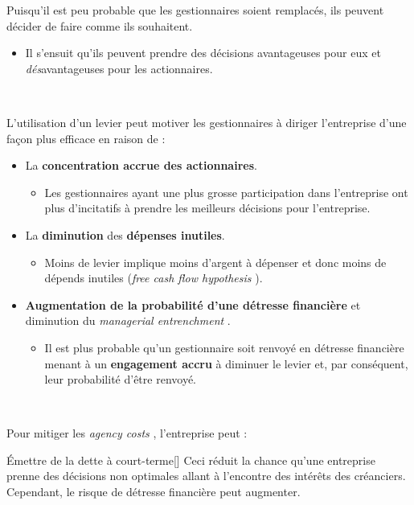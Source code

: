 \documentclass[10pt, french]{article}
\begin{document}
\begin{multicols*}{2}
\begin{definitionNOHFILLprop}
Puisqu'il est peu probable que les gestionnaires soient remplacés, ils peuvent décider de faire comme ils souhaitent.	\\

\begin{itemize}
	\item	Il s'ensuit qu'ils peuvent prendre des décisions avantageuses pour eux et \textit{dés}avantageuses pour les actionnaires.
\end{itemize}
\end{definitionNOHFILLprop}

\

L'utilisation d'un levier peut motiver les gestionnaires à diriger l'entreprise d'une façon plus efficace en raison de : 
\begin{itemize}
	\item	La \textbf{concentration accrue des actionnaires}.
		\begin{itemize}
		\item	Les gestionnaires ayant une plus grosse participation dans l'entreprise ont plus d'incitatifs à prendre les meilleurs décisions pour l'entreprise.
		\end{itemize}
	\item	La \textbf{diminution} des \textbf{dépenses inutiles}.
		\begin{itemize}
		\item	Moins de levier implique moins d'argent à dépenser et donc moins de dépends inutiles (\og \textit{free cash flow hypothesis} \fg{}).
		\end{itemize}
	\item	\textbf{Augmentation de la probabilité d'une détresse financière} et diminution du \og \textit{managerial entrenchment} \fg{}.
		\begin{itemize}
		\item	Il est plus probable qu'un gestionnaire soit renvoyé en détresse financière menant à un \textbf{engagement accru} à diminuer le levier et, par conséquent, leur probabilité d'être renvoyé.
		\end{itemize}
\end{itemize}

\

Pour mitiger les \og \textit{agency costs} \fg{}, l'entreprise peut : 
\begin{definitionGENERAL}{Émettre de la dette à court-terme}[]
Ceci réduit la chance qu'une entreprise prenne des décisions non optimales allant à l'encontre des intérêts des créanciers. Cependant, le risque de détresse financière peut augmenter.
\end{definitionGENERAL}


\end{multicols*}
\end{document}
